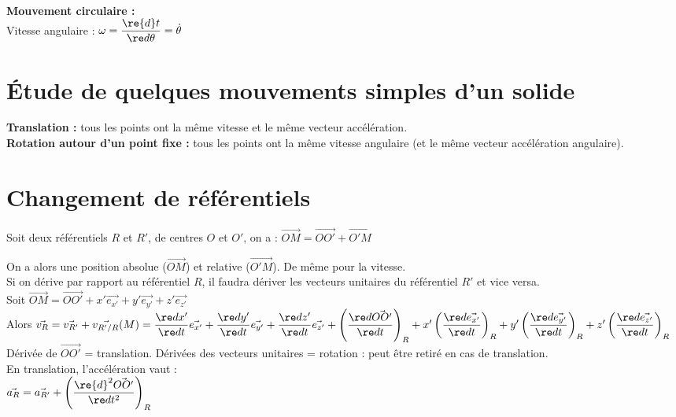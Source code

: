\documentclass[13pt, twoside, a4paper, french]{report}
\begin{document}
    \\
    \textbf{Mouvement circulaire :}\\
    Vitesse angulaire : $\omega = \dfrac{\re{d}t}{\re d \theta} = \dot \theta$
  
  
  \section{Étude de quelques mouvements simples d’un solide}\label{sec:etude-de-quelques-mouvements-simples-dun-solide}
    
    \textbf{Translation :} tous les points ont la même vitesse et le même vecteur accélération.\\
    
    \textbf{Rotation autour d'un point fixe :} tous les points ont la même vitesse angulaire (et le même vecteur accélération angulaire).
  
  
  \section{Changement de référentiels}\label{sec:changement-de-referentiels}
    
    Soit deux référentiels $R$ et $R'$, de centres $O$ et $O'$, on a : $\vec{OM} = \vec{OO'} + \vec{O'M}$
    
    On a alors une position absolue ($\vec{OM}$) et relative ($\vec{O'M}$).
    De même pour la vitesse.\\
    
    Si on dérive par rapport au référentiel $R$, il faudra dériver les vecteurs unitaires du référentiel $R'$ et vice versa.\\
    
    Soit $\vec{OM} = \vec{OO'} + x' \vec{e_{x'}} + y' \vec{e_{y'}} + z' \vec{e_{z'}}$\\
    Alors $\vec{v_{R}} = \vec{v_{R'}} + \vec{v_{R'/R}}(M) = \dfrac{\re d x'}{\re d t} \vec{e_{x'}} + \dfrac{\re d y'}{\re d t} \vec{e_{y'}} + \dfrac{\re d z'}{\re d t} \vec{e_{z'}} + \left( \dfrac{\re d \vec{OO'}}{\re d t} \right)_R + x' \left( \dfrac{\re d \vec{e_{x'}}}{\re d t} \right)_R + y' \left( \dfrac{\re d \vec{e_{y'}}}{\re d t} \right)_R + z' \left( \dfrac{\re d \vec{e_{z'}}}{\re d t} \right)_R$\\
    
    Dérivée de $\vec{OO'}$ = translation.
    Dérivées des vecteurs unitaires = rotation : peut être retiré en cas de translation.\\
    En translation, l'accélération vaut :\\
    
    $\vec{a_R} = \vec{a_{R'}} + \left( \dfrac{\re{d}^2 \vec{OO'}}{\re d t^2} \right)_R$
    
\end{document}
